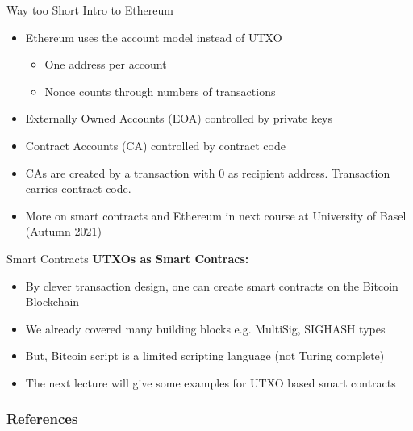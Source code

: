 \documentclass[handout]{beamer}
\begin{document}

\begin{frame}{Way too Short Intro to Ethereum}
	\begin{itemize}
		\item<1 ->Ethereum uses the account model instead of UTXO
		\begin{itemize}
			\item<1 ->One address per account
			\item<2 ->Nonce counts through numbers of transactions
		\end{itemize}
		\item<3 ->Externally Owned Accounts (EOA) controlled by private keys
		\item<4 ->Contract Accounts (CA) controlled by contract code
		\item<5 ->CAs are created by a transaction with 0 as recipient address. Transaction carries contract code.
		\item<6 ->More on smart contracts and Ethereum in next course at University of Basel (Autumn 2021)
	\end{itemize}
\end{frame}


\begin{frame}{Smart Contracts}
	\textbf{UTXOs as Smart Contracs:}
	\begin{itemize}
		\item<1-> By clever transaction design, one can create smart contracts on the Bitcoin Blockchain
		\item<2-> We already covered many building blocks e.g. MultiSig, SIGHASH types
		\item<3-> But, Bitcoin script is a limited scripting language (not Turing complete)
		\item<4-> The next lecture will give some examples for UTXO based smart contracts
	\end{itemize}
\end{frame}


\begin{frame}%
	\frametitle{References}
	
	
\end{frame}

\end{document}
